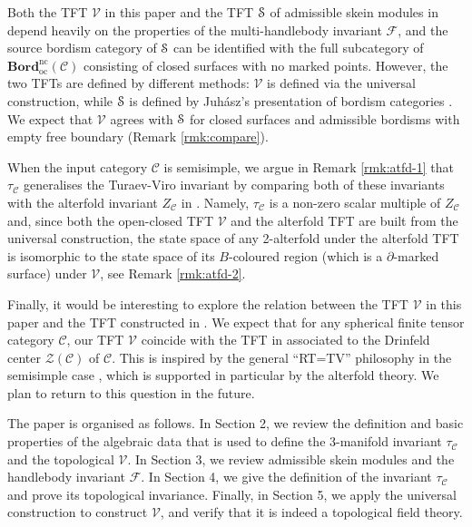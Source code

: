 \documentclass[11pt]{amsart}
\theoremstyle{definition}
\numberwithin{equation}{section}
\def\bd{{\partial}}
\def\cgpt{\mathscr{F}}
\def\ourBord{\mathbf{Bord}^{\operatorname{nc}}_{\operatorname{oc}}}
\def\ourV{\cV}
\def\cC{\mathcal{C}}
\def\cV{\mathcal{V}}
\def\cZ{\mathcal{Z}}
\begin{document}
Both the TFT $\ourV$ in this paper and the TFT $\EuScript{S}$ of admissible skein modules in \cite{CGPV23} depend heavily on the properties of the multi-handlebody
invariant $\cgpt$, and the source bordism category of $\EuScript{S}$ can be identified with the full subcategory of $\ourBord(\cC)$ consisting of closed surfaces with no marked points. 
However, the two TFTs are defined by different methods: $\ourV$ is defined via the universal construction, while $\EuScript{S}$ is defined by Juh\'asz's presentation of bordism categories \cite{Juh18}. 
We expect that $\ourV$ agrees with $\EuScript{S}$ for closed surfaces and admissible bordisms with empty free boundary (Remark \ref{rmk:compare}). 

When the input category $\cC$ is semisimple, we argue in Remark \ref{rmk:atfd-1} that $\tau_{\cC}$ generalises the Turaev-Viro invariant by comparing both of these invariants with the alterfold invariant $Z_{\cC}$ in \cite{atfd1}. 
Namely, $\tau_{\cC}$ is a non-zero scalar multiple of $Z_{\cC}$ and, since both the open-closed TFT $\ourV$ and the alterfold TFT are built from the universal construction, the state space of any 2-alterfold under the alterfold TFT is isomorphic to the state space of its $B$-coloured region (which is a $\bd$-marked surface) under $\ourV$, see Remark \ref{rmk:atfd-2}. 

Finally, it would be interesting to explore the relation between the TFT $\ourV$ in this paper and the TFT constructed in \cite{DeRenzi2022}. We expect that for any spherical finite tensor category $\cC$, our TFT $\ourV$ coincide with the TFT in \cite{DeRenzi2022} associated to the Drinfeld center $\cZ(\cC)$ of $\cC$. This is inspired by the general ``RT=TV'' philosophy in the semisimple case \cite{Turaev:2017uxl, atfd2}, which is supported in particular by the alterfold theory. We plan to return to this question in the future.

\medskip

The paper is organised as follows. In Section 2, we review the definition and basic properties of the algebraic data that is used to define the 3-manifold invariant $\tau_{\cC}$ and the topological $\ourV$. In Section 3, we review admissible skein modules and the handlebody invariant $\cgpt$. In Section 4, we give the definition of the invariant $\tau_{\cC}$ and prove its topological invariance. Finally, in Section 5, we apply the universal construction to construct $\ourV$, and verify that it is indeed a topological field theory. 

\medskip
\end{document}
